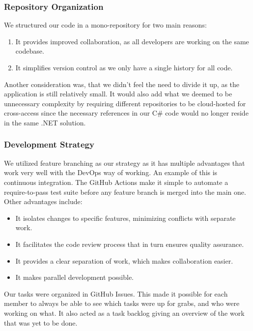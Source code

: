 \subsubsection{Repository Organization}

We structured our code in a mono-repository for two main reasons:
\begin{enumerate}
    \item It provides improved collaboration, as all developers are working on the same codebase.
    \item It simplifies version control as we only have a single history for all code.
\end{enumerate}
Another consideration was, that we didn't feel the need to divide it up, as the application is still relatively small. It would also add what we deemed to be unnecessary complexity by requiring different repositories to be cloud-hosted for cross-access since the necessary references in our C\# code would no longer reside in the same .NET solution.


\subsubsection{Development Strategy}

We utilized feature branching as our strategy as it has multiple advantages that work very well with the DevOps way of working. An example of this is continuous integration. The GitHub Actions make it simple to automate a require-to-pass test suite before any feature branch is merged into the main one. Other advantages include:

\begin{itemize}
    \item It isolates changes to specific features, minimizing conflicts with separate work.
    \item It facilitates the code review process that in turn ensures quality assurance.
    \item It provides a clear separation of work, which makes collaboration easier.
    \item It makes parallel development possible.
\end{itemize}

Our tasks were organized in GitHub Issues. This made it possible for each member to always be able to see which tasks were up for grabs, and who were working on what. It also acted as a task backlog giving an overview of the work that was yet to be done.

